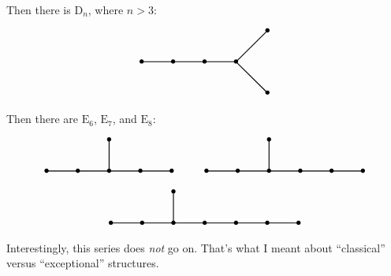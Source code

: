 \documentclass{article}
\begin{document}
Then there is \(\mathrm{D}_n\), where \(n > 3\): \[
  \begin{tikzpicture}
    \draw[thick] (0,0) node{$\bullet$} to (1,0) node{$\bullet$} to (2,0) node{$\bullet$} to (3,0) node {$\bullet$};
    \draw[thick] (3,0) to (4,1) node {$\bullet$};
    \draw[thick] (3,0) to (4,-1) node {$\bullet$};
  \end{tikzpicture}
\] Then there are \(\mathrm{E}_6\), \(\mathrm{E}_7\), and
\(\mathrm{E}_8\): \[
  \begin{gathered}
    \begin{tikzpicture}
      \draw[thick] (0,0) node{$\bullet$} to (1,0) node{$\bullet$} to (2,0) node{$\bullet$} to (3,0) node {$\bullet$} to (4,0) node {$\bullet$};
      \draw[thick] (2,0) to (2,1) node{$\bullet$};
    \end{tikzpicture}
    \qquad
    \begin{tikzpicture}
      \draw[thick] (0,0) node{$\bullet$} to (1,0) node{$\bullet$} to (2,0) node{$\bullet$} to (3,0) node {$\bullet$} to (4,0) node {$\bullet$} to (5,0) node {$\bullet$};
      \draw[thick] (2,0) to (2,1) node{$\bullet$};
    \end{tikzpicture}
  \\\begin{tikzpicture}
      \draw[thick] (0,0) node{$\bullet$} to (1,0) node{$\bullet$} to (2,0) node{$\bullet$} to (3,0) node {$\bullet$} to (4,0) node {$\bullet$} to (5,0) node {$\bullet$} to (6,0) node {$\bullet$};
      \draw[thick] (2,0) to (2,1) node{$\bullet$};
    \end{tikzpicture}
  \end{gathered}
\] Interestingly, this series does \emph{not} go on. That's what I meant
about ``classical'' versus ``exceptional'' structures.
\end{document}

